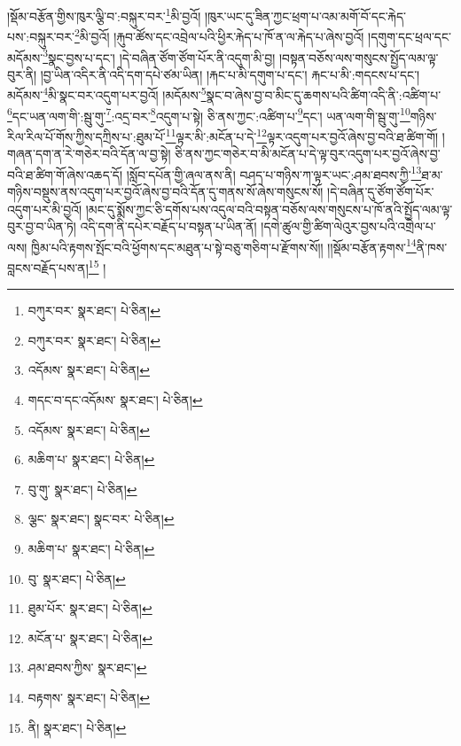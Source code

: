 །སྡོམ་བརྩོན་གྱིས་ཁུར་ལྕི་བ་:བསྐུར་བར་\footnote{བཀུར་བར་  སྣར་ཐང་།  པེ་ཅིན། }མི་བྱའོ། །ཁུར་ཡང་དུ་ཟིན་ཀྱང་ཕྲག་པ་འམ་མགོ་བོ་དང་རྐེད་པས་:བསྐུར་བར་\footnote{བཀུར་བར་  སྣར་ཐང་།  པེ་ཅིན། }མི་བྱའོ། །རྐུབ་ཚོས་དང་འབྲེལ་པའི་ཕྱིར་རྐེད་པ་ཁོ་ན་ལ་རྐེད་པ་ཞེས་བྱའོ། །དགུག་དང་ཕྲལ་དང་མདོམས་\footnote{འདོམས་  སྣར་ཐང་།  པེ་ཅིན། }སྣང་བྱས་པ་དང་། །དེ་བཞིན་ཙོག་ཙོག་པོར་ནི་འདུག་མི་བྱ། །བསྟན་བཅོས་ལས་གསུངས་སྤྱོད་ལམ་ལྟ་བུར་ནི། །བྱ་ཡིན་འདིར་ནི་འདི་དག་དཔེ་ཙམ་ཡིན། །རྐང་པ་མི་དགུག་པ་དང་། རྐང་པ་མི་:གདངས་པ་དང་། མདོམས་\footnote{གདང་བ་དང་འདོམས་  སྣར་ཐང་།  པེ་ཅིན། }མི་སྣང་བར་འདུག་པར་བྱའོ། །མདོམས་\footnote{འདོམས་  སྣར་ཐང་།  པེ་ཅིན། }སྣང་བ་ཞེས་བྱ་བ་མིང་དུ་ཆགས་པའི་ཚིག་འདི་ནི་:འཚིག་པ་\footnote{མཆིག་པ་  སྣར་ཐང་།  པེ་ཅིན། }དང་ཡན་ལག་གི་:སྦུ་གུ་\footnote{བུ་གུ་  སྣར་ཐང་།  པེ་ཅིན། }:འདྲ་བར་\footnote{ལྕང་  སྣར་ཐང་། སྣང་བར་  པེ་ཅིན། }འདུག་པ་སྟེ། ཅི་ནས་ཀྱང་:འཚིག་པ་\footnote{མཆིག་པ་  སྣར་ཐང་།  པེ་ཅིན། }དང་། ཡན་ལག་གི་སྦུ་གུ་\footnote{བུ་  སྣར་ཐང་།  པེ་ཅིན། }གཉིས་རིལ་རིལ་པོ་གོས་ཀྱིས་དཀྲིས་པ་:ཐུམ་པོ་\footnote{ཐུམ་པོར་  སྣར་ཐང་།  པེ་ཅིན། }ལྟར་མི་:མངོན་པ་དེ་\footnote{མངོན་པ་  སྣར་ཐང་།  པེ་ཅིན། }ལྟར་འདུག་པར་བྱའོ་ཞེས་བྱ་བའི་ཐ་ཚིག་གོ། །གཞན་དག་ན་རེ་གཅེར་བའི་དོན་ལ་བྱ་སྟེ། ཅི་ནས་ཀྱང་གཅེར་བ་མི་མངོན་པ་དེ་ལྟ་བུར་འདུག་པར་བྱའོ་ཞེས་བྱ་བའི་ཐ་ཚིག་གོ་ཞེས་འཆད་དོ། །སློབ་དཔོན་གྱི་ཞལ་ནས་ནི། བཤད་པ་གཉིས་ཀ་ལྟར་ཡང་:ཤམ་ཐབས་ཀྱི་\footnote{ཤམ་ཐབས་ཀྱིས་  སྣར་ཐང་། }ཐ་མ་གཉིས་བསྡུས་ནས་འདུག་པར་བྱའོ་ཞེས་བྱ་བའི་དོན་དུ་གནས་སོ་ཞེས་གསུངས་སོ། །དེ་བཞིན་དུ་ཙོག་ཙོག་པོར་འདུག་པར་མི་བྱའོ། །མང་དུ་སྨོས་ཀྱང་ཅི་དགོས་པས་འདུལ་བའི་བསྟན་བཅོས་ལས་གསུངས་པ་ཁོ་ནའི་སྤྱོད་ལམ་ལྟ་བུར་བྱ་བ་ཡིན་ཏེ། འདི་དག་ནི་དཔེར་བརྗོད་པ་བསྟན་པ་ཡིན་ནོ། །དགེ་ཚུལ་གྱི་ཚིག་ལེའུར་བྱས་པའི་འགྲེལ་པ་ལས། ཁྱིམ་པའི་རྟགས་སྤོང་བའི་ཕྱོགས་དང་མཐུན་པ་སྟེ་བཅུ་གཅིག་པ་རྫོགས་སོ།། །།སྡོམ་བརྩོན་རྟགས་\footnote{བརྟགས་  སྣར་ཐང་།  པེ་ཅིན། }ནི་ཁས་བླངས་བརྗོད་པས་ན།\footnote{ནི།  སྣར་ཐང་།  པེ་ཅིན། } །
